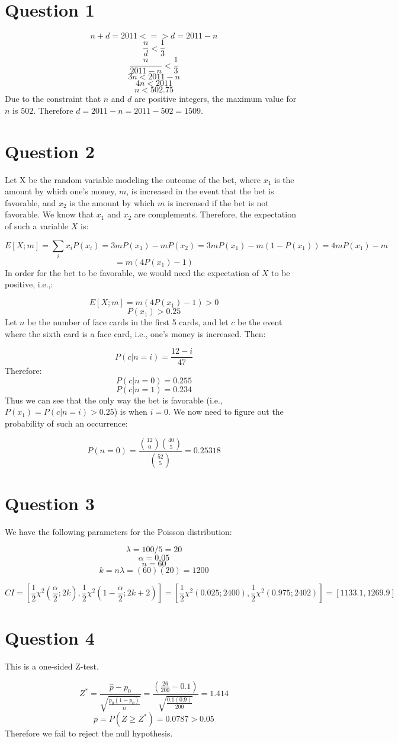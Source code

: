 \documentclass[12pt]{article}
\date{}
\begin{document}
\pagecolor{white}

\section{Question 1}

$$n + d = 2011 <=> d = 2011 - n$$
$$\frac{n} {d} < \frac{1}{3}$$
$$\frac{n}{2011 - n} <  \frac{1}{3}$$
$$3n < 2011 - n$$
$$4n < 2011$$
$$n < 502.75$$
Due to the constraint that $n$ and $d$ are positive integers, the maximum value for $n$ is $502$. Therefore $d = 2011 - n = 2011 - 502 = 1509$.

\section{Question 2}

Let X be the random variable modeling the outcome of the bet, where $x_1$ is the amount by which one's money, $m$, is increased in the event that the bet is favorable, and $x_2$ is the amount by which $m$ is increased if the bet is not favorable. We know that $x_1$ and $x_2$ are complements. Therefore, the expectation of such a variable $X$ is:

$$E[X; m] = \sum_i x_iP(x_i) = 3mP(x_1) - mP(x_2) = 3mP(x_1) - m(1 - P(x_1)) = 4mP(x_1) - m$$
$$= m(4P(x_1) - 1)$$
In order for the bet to be favorable, we would need the expectation of $X$ to be positive, i.e.,:

$$E[X; m] = m(4P(x_1) - 1) > 0$$
$$P(x_1) > 0.25$$
Let $n$ be the number of face cards in the first 5 cards, and let $c$ be the event where the sixth card is a face card, i.e., one's money is increased. Then:

$$P(c | n = i) = \frac{12 - i}{47} $$
Therefore:
$$P(c | n = 0) = 0.255$$
$$P(c | n = 1) =  0.234$$
Thus we can see that the only way the bet is favorable (i.e., $P(x_1) = P(c | n = i) > 0.25$) is when $i = 0$. We now need to figure out the probability of such an occurrence:

$$P(n = 0) = \frac{{12 \choose 0}{40 \choose 5}}{{52 \choose 5}} = 0.25318$$

\section{Question 3}

We have the following parameters for the Poisson distribution:

$$\lambda = 100 / 5 = 20$$
$$\alpha = 0.05$$
$$n = 60$$
$$k = n\lambda = (60)(20) = 1200$$

$$CI = [\frac{1}{2}\chi^2(\frac{\alpha}{2}; 2k), \frac{1}{2}\chi^2(1 - \frac{\alpha}{2}; 2k + 2)]
= [\frac{1}{2}\chi^2(0.025; 2400), \frac{1}{2}\chi^2(0.975; 2402)]
= [1133.1, 1269.9]$$

\section{Question 4}

This is a one-sided Z-test.

$$Z^* = \frac{\hat{p} - p_0}{\sqrt{\frac{p_0(1-p_0)}{n}}}  = \frac{(\frac{26}{200} - 0.1)}{\sqrt{\frac{0.1(0.9)}{200}}} = 1.414$$
$$p = P(Z \geq Z^*) = 0.0787 > 0.05$$
Therefore we fail to reject the null hypothesis.
\end{document}

